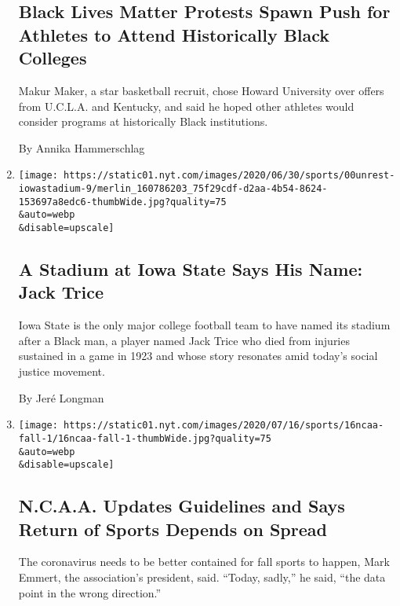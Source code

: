 \begin{enumerate}
{  \subsection{Black Lives Matter Protests Spawn Push for Athletes to
  Attend Historically Black
  Colleges}\label{black-lives-matter-protests-spawn-push-for-athletes-to-attend-historically-black-colleges}}

  Makur Maker, a star basketball recruit, chose Howard University over
  offers from U.C.L.A. and Kentucky, and said he hoped other athletes
  would consider programs at historically Black institutions.

  By Annika Hammerschlag
\item
  \href{/2020/07/20/sports/ncaafootball/Iowa-State-Jack-Trice-Stadium.html}{}

  \texttt{[image: https://static01.nyt.com/images/2020/06/30/sports/00unrest-iowastadium-9/merlin\_160786203\_75f29cdf-d2aa-4b54-8624-153697a8edc6-thumbWide.jpg?quality=75\\\&auto=webp\\\&disable=upscale]}

  \hypertarget{a-stadium-at-iowa-state-says-his-name-jack-trice}{%
  \subsection{A Stadium at Iowa State Says His Name: Jack
  Trice}\label{a-stadium-at-iowa-state-says-his-name-jack-trice}}

  Iowa State is the only major college football team to have named its
  stadium after a Black man, a player named Jack Trice who died from
  injuries sustained in a game in 1923 and whose story resonates amid
  today's social justice movement.

  By Jeré Longman
\item
  \href{/2020/07/16/sports/ncaafootball/ncaa-guidelines-fall-sports.html}{}

  \texttt{[image: https://static01.nyt.com/images/2020/07/16/sports/16ncaa-fall-1/16ncaa-fall-1-thumbWide.jpg?quality=75\\\&auto=webp\\\&disable=upscale]}

  \hypertarget{ncaa-updates-guidelines-and-says-return-of-sports-depends-on-spread}{%
  \subsection{N.C.A.A. Updates Guidelines and Says Return of Sports
  Depends on
  Spread}\label{ncaa-updates-guidelines-and-says-return-of-sports-depends-on-spread}}

  The coronavirus needs to be better contained for fall sports to
  happen, Mark Emmert, the association's president, said. ``Today,
  sadly,'' he said, ``the data point in the wrong direction.''


\end{enumerate}
